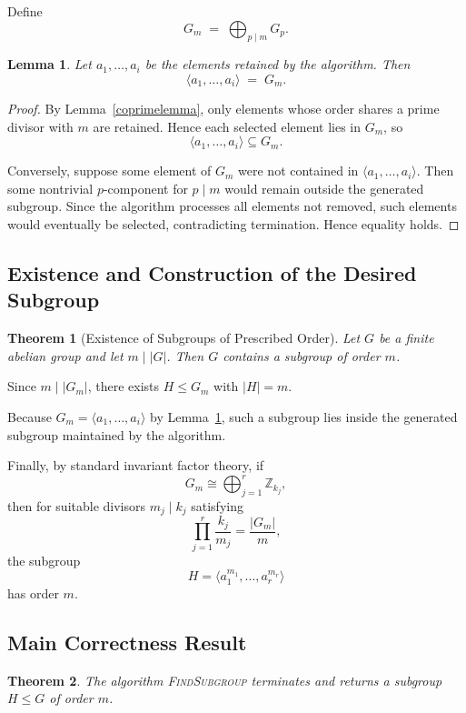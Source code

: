 \documentclass[11pt]{article}
\newtheorem{theorem}{Theorem}[section]
\newtheorem{lemma}{Lemma}[section]
\begin{document}
	Define
	\[
	G_m \;=\; \bigoplus_{p \mid m} G_p.
	\]
	
	\begin{lemma}\label{generatedequals}
		Let $a_1,\dots,a_i$ be the elements retained by the algorithm. Then
		\[
		\langle a_1,\dots,a_i\rangle \;=\; G_m.
		\]
	\end{lemma}
	
	\begin{proof}
		By Lemma~\ref{coprimelemma}, only elements whose order shares a prime divisor with $m$ are retained. Hence each selected element lies in $G_m$, so
		\[
		\langle a_1,\dots,a_i\rangle \subseteq G_m.
		\]
		
		Conversely, suppose some element of $G_m$ were not contained in $\langle a_1,\dots,a_i\rangle$. Then some nontrivial $p$-component for $p \mid m$ would remain outside the generated subgroup. Since the algorithm processes all elements not removed, such elements would eventually be selected, contradicting termination. Hence equality holds.
	\end{proof}
	
	\subsection{Existence and Construction of the Desired Subgroup}
	
	\begin{theorem}[Existence of Subgroups of Prescribed Order]
		Let $G$ be a finite abelian group and let $m \mid |G|$. Then $G$ contains a subgroup of order $m$.
	\end{theorem}
	
	Since $m \mid |G_m|$, there exists $H \le G_m$ with $|H|=m$.
	
	Because $G_m = \langle a_1,\dots,a_i\rangle$ by Lemma~\ref{generatedequals}, such a subgroup lies inside the generated subgroup maintained by the algorithm.
	
	Finally, by standard invariant factor theory, if
	\[
	G_m \cong \bigoplus_{j=1}^r \mathbb{Z}_{k_j},
	\]
	then for suitable divisors $m_j \mid k_j$ satisfying
	\[
	\prod_{j=1}^r \frac{k_j}{m_j} = \frac{|G_m|}{m},
	\]
	the subgroup
	\[
	H = \langle a_1^{m_1},\dots,a_r^{m_r}\rangle
	\]
	has order $m$.
	
	\subsection{Main Correctness Result}
	
	\begin{theorem}
		The algorithm \textsc{FindSubgroup} terminates and returns a subgroup $H \le G$ of order $m$.
	\end{theorem}
	
\end{document}
